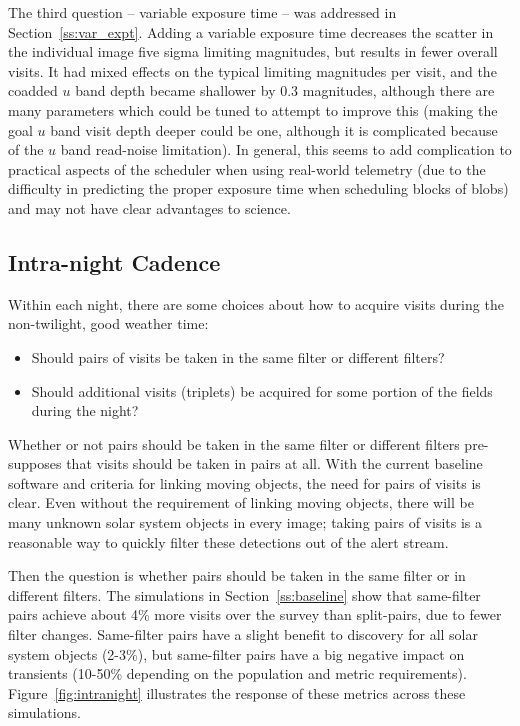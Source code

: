 The third question -- variable exposure time -- was addressed in Section~\ref{ss:var_expt}. Adding a variable exposure time decreases the scatter in the individual image five sigma limiting magnitudes, but results in fewer overall visits. It had mixed effects on the typical limiting magnitudes per visit, and the coadded $u$ band depth became shallower by 0.3 magnitudes, although there are many parameters which could be tuned to attempt to improve this (making the goal $u$ band visit depth deeper could be one, although it is complicated because of the $u$ band read-noise limitation). In general, this seems to add complication to practical aspects of the scheduler when using real-world telemetry (due to the difficulty in predicting the proper exposure time when scheduling blocks of blobs) and may not have clear advantages to science.

\subsection{Intra-night Cadence}\label{sec:intranight}

Within each night, there are some choices about how to acquire visits during the non-twilight, good weather time:
\begin{itemize}
\item Should pairs of visits be taken in the same filter or different filters?
\item Should additional visits (triplets) be acquired for some portion of the fields during the night?
\end{itemize}

Whether or not pairs should be taken in the same filter or different filters pre-supposes that visits should be taken in pairs at all. With the current baseline software and criteria for linking moving objects, the need for pairs of visits is clear. Even without the requirement of linking moving objects, there will be many unknown solar system objects in every image; taking pairs of visits is a reasonable way to quickly filter these detections out of the alert stream. 

Then the question is whether pairs should be taken in the same filter or in different filters. The simulations in Section~\ref{ss:baseline} show that same-filter pairs achieve about 4\% more visits over the survey than split-pairs, due to fewer filter changes. Same-filter pairs have a slight benefit to discovery for all solar system objects (2-3\%), but same-filter pairs have a big negative impact on transients (10-50\% depending on the population and metric requirements). Figure~\ref{fig:intranight} illustrates the response of these metrics across these simulations.

